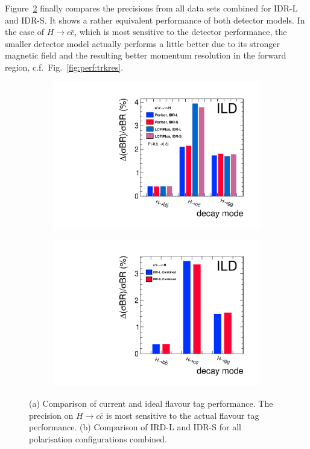 Figure~\ref{fig:Hbbccgg:BR:LS} finally compares the precisions from all data sets combined for IDR-L and IDR-S. It shows a rather equivalent performance of both detector models. In the case of $H \to c\bar{c}$, which is most sensitive to the detector performance, the smaller detector model actually performs a little better due to its stronger magnetic field and the resulting better momentum resolution in the forward region, c.f.\ Fig.~\ref{fig:perf:trkres}.

\begin{figure}[htbp]
\begin{subfigure}{0.49\hsize} 
 \includegraphics[width=\textwidth]{Performance/fig/IDRplot1.pdf}
 \caption{ \label{fig:Hbbccgg:BR:cheat}}
 \end{subfigure}
\begin{subfigure}{0.49\hsize} 
 \includegraphics[width=\textwidth]{Performance/fig/IDRplot3.pdf}
 \caption{  \label{fig:Hbbccgg:BR:LS}}
 \end{subfigure}
\caption{
(a) Comparison of current and ideal flavour tag performance. The precision on $H \to c\bar{c}$ is most sensitive to the actual flavour tag performance.
(b) Comparison of IRD-L and IDR-S for all polarisation configurations combined.
}
\label{fig:Hbbccgg:BR}
\end{figure}

